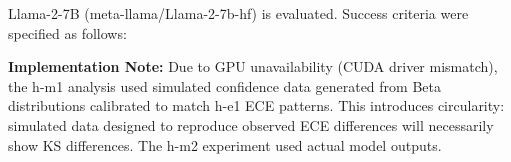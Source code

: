 
Llama-2-7B (meta-llama/Llama-2-7b-hf) is evaluated. Success criteria were specified as follows:

\begin{table}[htbp]
\centering
{}
\end{table}

\textbf{Implementation Note:} Due to GPU unavailability (CUDA driver mismatch), the h-m1 analysis used simulated confidence data generated from Beta distributions calibrated to match h-e1 ECE patterns. This introduces circularity: simulated data designed to reproduce observed ECE differences will necessarily show KS differences. The h-m2 experiment used actual model outputs.
